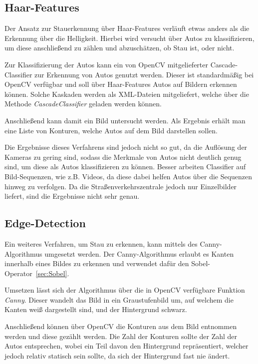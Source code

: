 \subsection{Haar-Features}
Der Ansatz zur Stauerkennung über Haar-Features verläuft etwas anders als die Erkennung über die Helligkeit.
Hierbei wird versucht über Autos zu klassifizieren, um diese anschließend zu zählen und abzuschätzen, ob Stau ist, oder nicht.

Zur Klassifizierung der Autos kann ein von OpenCV mitgelieferter Cascade-Classifier zur Erkennung von Autos genutzt werden.
Dieser ist standardmäßig bei OpenCV verfügbar und soll über Haar-Features Autos auf Bildern erkennen können.
Solche Kaskaden werden als XML-Dateien mitgeliefert, welche über die Methode {\em CascadeClassifier} geladen werden können.

Anschließend kann damit ein Bild untersucht werden. Als Ergebnis erhält man eine Liste von Konturen, welche Autos auf dem Bild darstellen sollen.


Die Ergebnisse dieses Verfahrens sind jedoch nicht so gut, da die Auflösung der Kameras zu gering sind, sodass die Merkmale von Autos nicht deutlich genug sind, um diese als Autos klassifizieren zu können.
Besser arbeiten Classifier auf Bild-Sequenzen, wie z.B. Videos, da diese dabei helfen Autos über die Sequenzen hinweg zu verfolgen.
Da die Straßenverkehrszentrale jedoch nur Einzelbilder liefert, sind die Ergebnisse nicht sehr genau.

\subsection{Edge-Detection}
Ein weiteres Verfahren, um Stau zu erkennen, kann mittels des Canny-Algorithmus umgesetzt werden.
Der Canny-Algorithmus erlaubt es Kanten innerhalb eines Bildes zu erkennen und verwendet dafür den Sobel-Operator~\ref{sec:Sobel}.

Umsetzen lässt sich der Algorithmus über die in OpenCV verfügbare Funktion {\em Canny}.
Dieser wandelt das Bild in ein Graustufenbild um, auf welchem die Kanten weiß dargestellt sind, und der Hintergrund schwarz.

Anschließend können über OpenCV die Konturen aus dem Bild entnommen werden und diese gezählt werden.
Die Zahl der Konturen sollte der Zahl der Autos entsprechen, wobei ein Teil davon den Hintergrund repräsentiert, welcher jedoch relativ statisch sein sollte, da sich der Hintergrund fast nie ändert.

